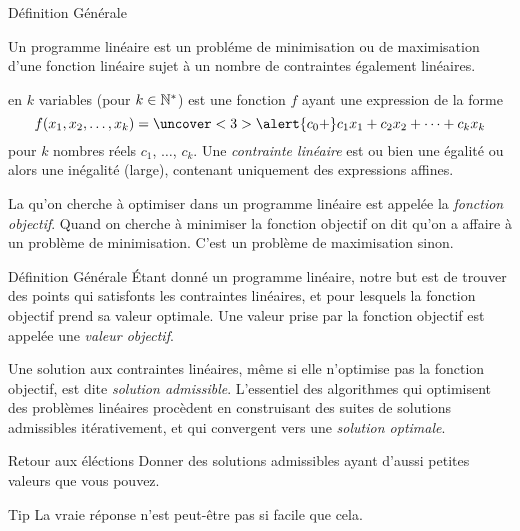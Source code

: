 \documentclass[aspectratio = 169]{beamer}
\begin{document}
\begin{frame}{D\'efinition G\'en\'erale}
  \begin{defn}
    Un programme lin\'eaire est un probl\'eme de minimisation ou de
    maximisation d'une fonction lin\'eaire sujet \`a un nombre de
    contraintes \'egalement lin\'eaires.
  \end{defn}
   en $k$ variables (pour $k \in \mathbb{N}^*$) est une fonction
  $f$ ayant une expression de la forme
  \[
    f(x_1, x_2, \ldots, x_k) = \uncover<3>{\alert{c_0 + }} c_1x_1 + c_2x_2 + \cdots + c_kx_k
  \]
  pour $k$ nombres r\'eels $c_1$, $\ldots$, $c_k$. Une
  \emph{contrainte lin\'eaire} est ou bien une \'egalit\'e ou alors
  une in\'egalit\'e (large), contenant uniquement des expressions
  affines.

  \pause La  qu'on cherche \`a optimiser dans un programme
  lin\'eaire est appel\'ee la \emph{fonction objectif}. Quand on
  cherche \`a minimiser la fonction objectif on dit qu'on a affaire
  \`a un probl\`eme de minimisation. C'est un probl\`eme de
  maximisation sinon.
\end{frame}

\begin{frame}{D\'efinition G\'en\'erale}
  \'Etant donn\'e un programme lin\'eaire, notre but est de trouver
  des points qui satisfonts les contraintes lin\'eaires, et pour
  lesquels la fonction objectif prend sa valeur optimale. Une valeur
  prise par la fonction objectif est appel\'ee une \emph{valeur
    objectif}.

  \pause
  Une solution aux contraintes lin\'eaires, m\^eme si elle n'optimise
  pas la fonction objectif, est dite \emph{solution
    admissible}. L'essentiel des algorithmes qui optimisent des
  probl\`emes lin\'eaires proc\`edent en construisant des suites de
  solutions admissibles it\'erativement, et qui convergent vers une
  \emph{solution optimale}.  \pause
  \begin{halfshyblock}{Retour aux \'el\'ections}
    Donner des solutions admissibles ayant d'aussi petites valeurs que
    vous pouvez.
  \end{halfshyblock}
  \pause
  \begin{alertblock}{Tip}
    La vraie r\'eponse n'est peut-\^etre pas si facile que cela.
  \end{alertblock}
\end{frame}
\end{document}

